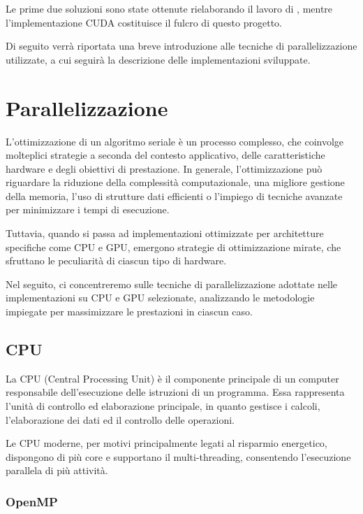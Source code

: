 \documentclass[12pt,a4paper]{report}
\begin{document}
Le prime due soluzioni sono state ottenute rielaborando il lavoro di \cite{Colletta2024}, mentre l'implementazione CUDA
costituisce il fulcro di questo progetto.

Di seguito verrà riportata una breve introduzione alle tecniche di parallelizzazione utilizzate, a cui seguirà la descrizione
delle implementazioni sviluppate.

\section{Parallelizzazione}

L'ottimizzazione di un algoritmo seriale è un processo complesso, che coinvolge molteplici strategie a seconda del contesto
applicativo, delle caratteristiche hardware e degli obiettivi di prestazione.
In generale, l'ottimizzazione può riguardare la riduzione della complessità computazionale, una migliore gestione della memoria,
l'uso di strutture dati efficienti o l'impiego di tecniche avanzate per minimizzare i tempi di esecuzione.

Tuttavia, quando si passa ad implementazioni ottimizzate per architetture specifiche come CPU e GPU, emergono strategie di
ottimizzazione mirate, che sfruttano le peculiarità di ciascun tipo di hardware.

Nel seguito, ci concentreremo sulle tecniche di parallelizzazione adottate nelle implementazioni su CPU e GPU selezionate,
analizzando le metodologie impiegate per massimizzare le prestazioni in ciascun caso.

\subsection{CPU}

La CPU (Central Processing Unit) è il componente principale di un computer responsabile dell'esecuzione delle istruzioni di un
programma.
Essa rappresenta l'unità di controllo ed elaborazione principale, in quanto gestisce i calcoli, l'elaborazione dei dati ed il
controllo delle operazioni.

Le CPU moderne, per motivi principalmente legati al risparmio energetico, dispongono di più core e supportano il multi-threading,
consentendo l'esecuzione parallela di più attività.

\subsubsection{OpenMP}
\end{document}
